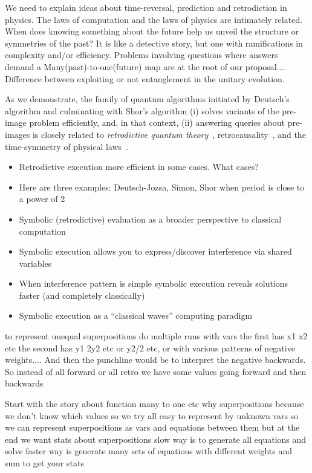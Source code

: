 \documentclass{article}
\begin{document}
\begin{refsection}
We need to explain ideas about time-reversal, prediction and retrodiction in 
physics. The laws of computation and the laws of physics are intimately related. 
When does knowing something about the future help us unveil the structure or 
symmetries of the past? It is like a detective story, but one with 
ramifications in complexity and/or efficiency. Problems involving questions 
where answers demand a Many(past)-to-one(future) map are at the root of 
our proposal.... {\color{red} Difference between exploiting or not entanglement
in the unitary evolution.}

As we demonstrate, the family of quantum algorithms initiated by
Deutsch's algorithm and culminating with Shor's algorithm (i) solves
variants of the pre-image problem efficiently, and, in that context,
(ii) answering queries about pre-images is closely related to
\emph{retrodictive quantum theory}~\cite{sym13040586},
retrocausality~\cite{Aharonov2008}, and the time-symmetry of physical
laws~\cite{RevModPhys.27.179}.


\begin{itemize}
\item Retrodictive execution more efficient in some cases. What cases?
\item Here are three examples: Deutsch-Jozsa, Simon, Shor when period
  is close to a power of 2
\item Symbolic (retrodictive) evaluation as a broader perspective to classical computation
\item Symbolic execution allows you to express/discover interference via shared variables
\item When interference pattern is simple symbolic execution reveals
  solutions faster (and completely classically)
\item Symbolic execution as a “classical waves” computing paradigm
\end{itemize}


to represent unequal superpositions do multiple runs with vars the
first has x1 x2 etc the second has y1 2y2 etc or y2/2 etc, or with
various patterns of negative weights.... And then the punchline would
be to interpret the negative backwards. So instead of all forward or
all retro we have some values going forward and then backwards

Start with the story about function many to one etc why superpositions
because we don’t know which values so we try all easy to represent by
unknown vars so we can represent superpositions as vars and equations
between them but at the end we want stats about superpositions slow
way is to generate all equations and solve faster way is generate many
sets of equations with different weights and sum to get your stats



\end{refsection}
\end{document}
